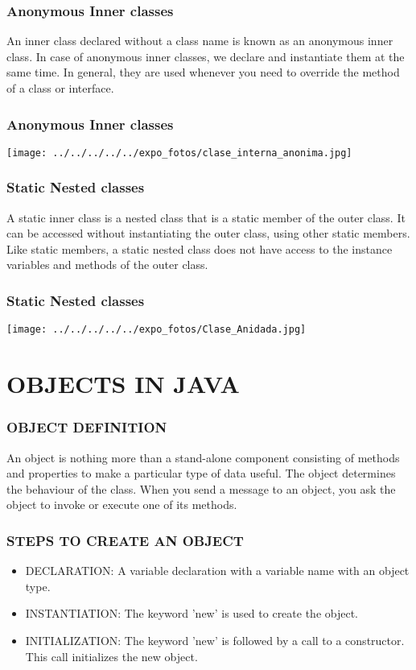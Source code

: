 \documentclass[11pt,a4paper]{beamer}
\begin{document}
\begin{frame}
\frametitle{Anonymous Inner classes}
An inner class declared without a class name is known as an anonymous inner class. In case of anonymous inner classes, we declare and instantiate them at the same time. In general, they are used whenever you need to override the method of a class or interface.
\end{frame}

\begin{frame}
\frametitle{Anonymous Inner classes}
\begin{center}
\texttt{[image: ../../../../../expo\_fotos/clase\_interna\_anonima.jpg]} 
\end{center}
\end{frame}

\begin{frame}
\frametitle{Static Nested classes}
A static inner class is a nested class that is a static member of the outer class. It can be accessed without instantiating the outer class, using other static members. Like static members, a static nested class does not have access to the instance variables and methods of the outer class.
\end{frame}

\begin{frame}
\frametitle{Static Nested classes}
\begin{center}
\texttt{[image: ../../../../../expo\_fotos/Clase\_Anidada.jpg]} 
\end{center}
\end{frame}

\section{OBJECTS IN JAVA}
\begin{frame}
\frametitle{OBJECT DEFINITION}
An object is nothing more than a stand-alone component consisting of methods and properties to make a particular type of data useful. The object determines the behaviour of the class. When you send a message to an object, you ask the object to invoke or execute one of its methods.
\end{frame}

\begin{frame}
\frametitle{STEPS TO CREATE AN OBJECT}
\begin{itemize}
\item DECLARATION: A variable declaration with a variable name with an object type.
\item INSTANTIATION: The keyword 'new' is used to create the object.
\item INITIALIZATION: The keyword 'new' is followed by a call to a constructor. This call initializes the new object.
\end{itemize}
\end{frame}
\end{document}
